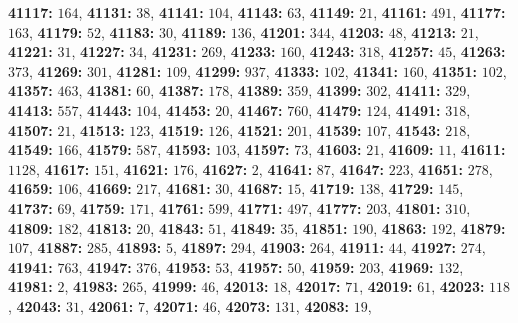 \textsf{\bfseries 41117:} $164$, \textsf{\bfseries 41131:} $38$, \textsf{\bfseries 41141:} $104$, \textsf{\bfseries 41143:} $63$, \textsf{\bfseries 41149:} $21$, \textsf{\bfseries 41161:} $491$, \textsf{\bfseries 41177:} $163$, \textsf{\bfseries 41179:} $52$, \textsf{\bfseries 41183:} $30$, \textsf{\bfseries 41189:} $136$, \textsf{\bfseries 41201:} $344$, \textsf{\bfseries 41203:} $48$, \textsf{\bfseries 41213:} $21$, \textsf{\bfseries 41221:} $31$, \textsf{\bfseries 41227:} $34$, \textsf{\bfseries 41231:} $269$, \textsf{\bfseries 41233:} $160$, \textsf{\bfseries 41243:} $318$, \textsf{\bfseries 41257:} $45$, \textsf{\bfseries 41263:} $373$, \textsf{\bfseries 41269:} $301$, \textsf{\bfseries 41281:} $109$, \textsf{\bfseries 41299:} $937$, \textsf{\bfseries 41333:} $102$, \textsf{\bfseries 41341:} $160$, \textsf{\bfseries 41351:} $102$, \textsf{\bfseries 41357:} $463$, \textsf{\bfseries 41381:} $60$, \textsf{\bfseries 41387:} $178$, \textsf{\bfseries 41389:} $359$, \textsf{\bfseries 41399:} $302$, \textsf{\bfseries 41411:} $329$, \textsf{\bfseries 41413:} $557$, \textsf{\bfseries 41443:} $104$, \textsf{\bfseries 41453:} $20$, \textsf{\bfseries 41467:} $760$, \textsf{\bfseries 41479:} $124$, \textsf{\bfseries 41491:} $318$, \textsf{\bfseries 41507:} $21$, \textsf{\bfseries 41513:} $123$, \textsf{\bfseries 41519:} $126$, \textsf{\bfseries 41521:} $201$, \textsf{\bfseries 41539:} $107$, \textsf{\bfseries 41543:} $218$, \textsf{\bfseries 41549:} $166$, \textsf{\bfseries 41579:} $587$, \textsf{\bfseries 41593:} $103$, \textsf{\bfseries 41597:} $73$, \textsf{\bfseries 41603:} $21$, \textsf{\bfseries 41609:} $11$, \textsf{\bfseries 41611:} $1128$, \textsf{\bfseries 41617:} $151$, \textsf{\bfseries 41621:} $176$, \textsf{\bfseries 41627:} $2$, \textsf{\bfseries 41641:} $87$, \textsf{\bfseries 41647:} $223$, \textsf{\bfseries 41651:} $278$, \textsf{\bfseries 41659:} $106$, \textsf{\bfseries 41669:} $217$, \textsf{\bfseries 41681:} $30$, \textsf{\bfseries 41687:} $15$, \textsf{\bfseries 41719:} $138$, \textsf{\bfseries 41729:} $145$, \textsf{\bfseries 41737:} $69$, \textsf{\bfseries 41759:} $171$, \textsf{\bfseries 41761:} $599$, \textsf{\bfseries 41771:} $497$, \textsf{\bfseries 41777:} $203$, \textsf{\bfseries 41801:} $310$, \textsf{\bfseries 41809:} $182$, \textsf{\bfseries 41813:} $20$, \textsf{\bfseries 41843:} $51$, \textsf{\bfseries 41849:} $35$, \textsf{\bfseries 41851:} $190$, \textsf{\bfseries 41863:} $192$, \textsf{\bfseries 41879:} $107$, \textsf{\bfseries 41887:} $285$, \textsf{\bfseries 41893:} $5$, \textsf{\bfseries 41897:} $294$, \textsf{\bfseries 41903:} $264$, \textsf{\bfseries 41911:} $44$, \textsf{\bfseries 41927:} $274$, \textsf{\bfseries 41941:} $763$, \textsf{\bfseries 41947:} $376$, \textsf{\bfseries 41953:} $53$, \textsf{\bfseries 41957:} $50$, \textsf{\bfseries 41959:} $203$, \textsf{\bfseries 41969:} $132$, \textsf{\bfseries 41981:} $2$, \textsf{\bfseries 41983:} $265$, \textsf{\bfseries 41999:} $46$, \textsf{\bfseries 42013:} $18$, \textsf{\bfseries 42017:} $71$, \textsf{\bfseries 42019:} $61$, \textsf{\bfseries 42023:} $118$, \textsf{\bfseries 42043:} $31$, \textsf{\bfseries 42061:} $7$, \textsf{\bfseries 42071:} $46$, \textsf{\bfseries 42073:} $131$, \textsf{\bfseries 42083:} $19$, 
